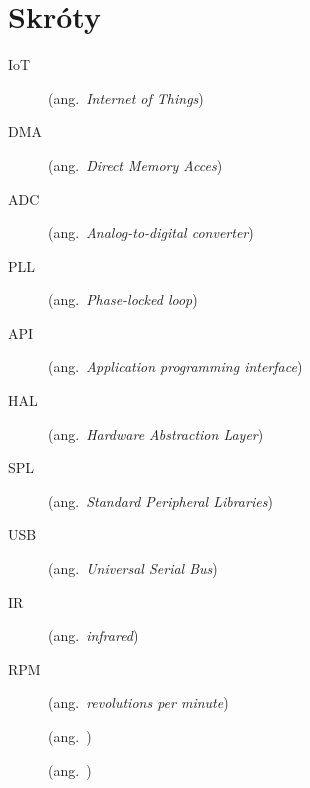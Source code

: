 \chapter*{Skróty}\mbox{}
\label{sec:skroty}
\noindent
\begin{description}
	\item [IoT] (ang.\ \emph{Internet of Things})
	\item [DMA] (ang.\ \emph{Direct Memory Acces})
	\item [ADC] (ang.\ \emph{Analog-to-digital converter})
	\item [PLL] (ang.\ \emph{Phase-locked loop})
	\item [API] (ang.\ \emph{Application programming interface})
	\item [HAL] (ang.\ \emph{Hardware Abstraction Layer})
	\item [SPL] (ang.\ \emph{Standard Peripheral Libraries})
	\item [USB] (ang.\ \emph{Universal Serial Bus})
	\item [IR] (ang.\ \emph{infrared})
	\item [RPM] (ang.\ \emph{revolutions per minute})
	\item [] (ang.\ \emph{})
	\item [] (ang.\ \emph{})
\end{description}
